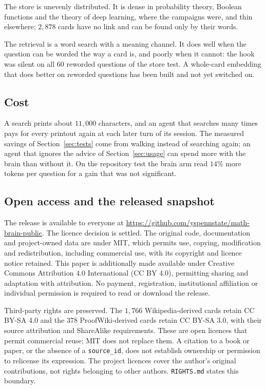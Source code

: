 The store is unevenly distributed. It is dense in probability theory, Boolean functions and the theory of deep learning, where the campaigns were, and thin elsewhere; $2{,}878$ cards have no link and can be found only by their words.

The retrieval is a word search with a meaning channel. It does well when the question can be worded the way a card is, and poorly when it cannot: the hook was silent on all $60$ reworded questions of the store test. A whole-card embedding that does better on reworded questions has been built and not yet switched on.

\subsection{Cost}
A search prints about $11{,}000$ characters, and an agent that searches many times pays for every printout again at each later turn of its session. The measured savings of Section~\ref{sec:tests} come from walking instead of searching again; an agent that ignores the advice of Section~\ref{sec:usage} can spend more with the brain than without it. On the repository test the brain arm read $14\%$ more tokens per question for a gain that was not significant.

\subsection{Open access and the released snapshot}\label{sec:release}
The release is available to everyone at \url{https://github.com/yspennstate/math-brain-public}. The licence decision is settled. The original code, documentation and project-owned data are under MIT, which permits use, copying, modification and redistribution, including commercial use, with its copyright and licence notice retained. This paper is additionally made available under Creative Commons Attribution 4.0 International (CC BY 4.0), permitting sharing and adaptation with attribution. No payment, registration, institutional affiliation or individual permission is required to read or download the release.

Third-party rights are preserved. The $1{,}766$ Wikipedia-derived cards retain CC BY-SA 4.0 and the $378$ ProofWiki-derived cards retain CC BY-SA 3.0, with their source attribution and ShareAlike requirements. These are open licences that permit commercial reuse; MIT does not replace them. A citation to a book or paper, or the absence of a \texttt{source\_id}, does not establish ownership or permission to relicense its expression. The project licences cover the author's original contributions, not rights belonging to other authors. \texttt{RIGHTS.md} states this boundary.

